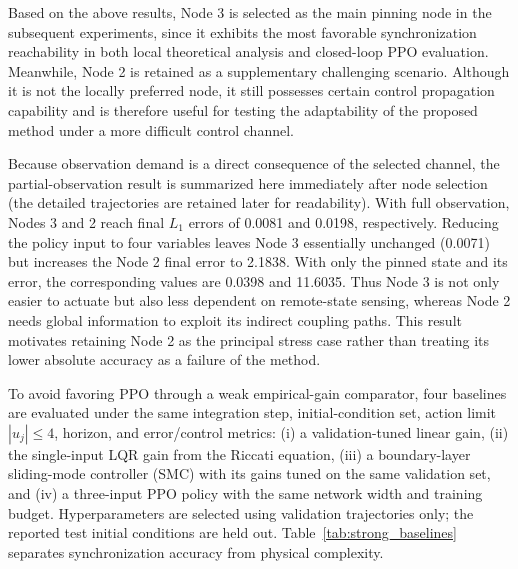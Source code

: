 \documentclass[10pt,twocolumn]{article}
\newcommand{\rev}[1]{{\color{revisionblue}#1}}
\theoremstyle{definition}
\begin{document}
Based on the above results, Node 3 is selected as the main pinning node in the subsequent experiments, since it exhibits the most favorable synchronization reachability in both local theoretical analysis and closed-loop PPO evaluation. Meanwhile, Node 2 is retained as a supplementary challenging scenario. Although it is not the locally preferred node, it still possesses certain control propagation capability and is therefore useful for testing the adaptability of the proposed method under a more difficult control channel.

\rev{Because observation demand is a direct consequence of the selected channel, the partial-observation result is summarized here immediately after node selection (the detailed trajectories are retained later for readability). With full observation, Nodes 3 and 2 reach final $L_1$ errors of 0.0081 and 0.0198, respectively. Reducing the policy input to four variables leaves Node 3 essentially unchanged (0.0071) but increases the Node 2 final error to 2.1838. With only the pinned state and its error, the corresponding values are 0.0398 and 11.6035. Thus Node 3 is not only easier to actuate but also less dependent on remote-state sensing, whereas Node 2 needs global information to exploit its indirect coupling paths. This result motivates retaining Node 2 as the principal stress case rather than treating its lower absolute accuracy as a failure of the method.}

\rev{To avoid favoring PPO through a weak empirical-gain comparator, four baselines are evaluated under the same integration step, initial-condition set, action limit $|u_j|\le4$, horizon, and error/control metrics: (i) a validation-tuned linear gain, (ii) the single-input LQR gain from the Riccati equation, (iii) a boundary-layer sliding-mode controller (SMC) with its gains tuned on the same validation set, and (iv) a three-input PPO policy with the same network width and training budget. Hyperparameters are selected using validation trajectories only; the reported test initial conditions are held out. Table~\ref{tab:strong_baselines} separates synchronization accuracy from physical complexity.}
\end{document}
